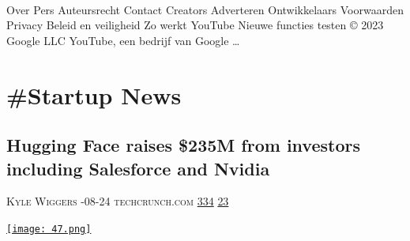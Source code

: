 \documentclass[10pt,a4paper]{article}
\begin{document}
\begin{multicols}{2}
\paragraph{}
Over
Pers
Auteursrecht
Contact
Creators
Adverteren
Ontwikkelaars
Voorwaarden
Privacy
Beleid en veiligheid
Zo werkt YouTube
Nieuwe functies testen
© 2023 Google LLC
YouTube, een bedrijf van Google
\dots\par
\end{multicols}

\newpage
\section{\#Startup News}

\begin{multicols}{2}
\raggedcolumns
\noindent\begin{minipage}{\linewidth}
\medskip
\subsection{Hugging Face raises \$235M from investors including Salesforce and Nvidia}
\textsc{\footnotesize
{\scriptsize\faUser}\space 
Kyle Wiggers 
{\scriptsize\faCalendar}-08-24 
{\scriptsize\faGlobe}\space 
techcrunch.com 
{\scriptsize\faThumbsOUp}\space 
\href{http://news.ycombinator.com/item?id=37248895\&utm\_term=comment}{334} 
{\scriptsize\faComments}\space 
\href{http://news.ycombinator.com/item?id=37248895\&utm\_term=comment}{23} 
}
\par\medskip\noindent
\href{https://techcrunch.com/2023/08/24/hugging-face-raises-235m-from-investors-including-salesforce-and-nvidia/?utm\_source=hackernewsletter\&utm\_medium=email\&utm\_term=startup\_news}{
    \texttt{[image: 47.png]}
}
\end{minipage}

\end{multicols}
\end{document}

